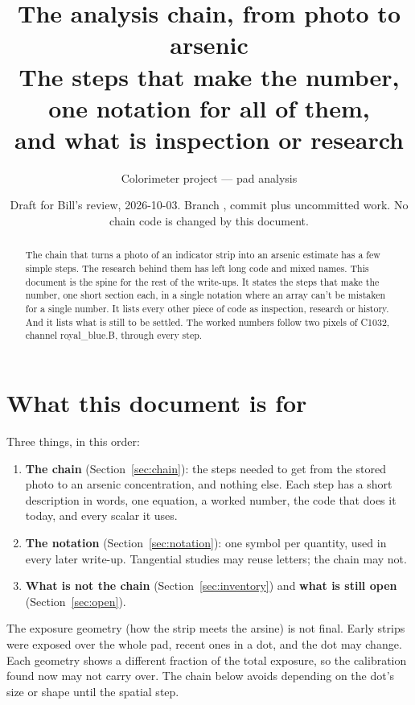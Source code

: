 \documentclass[11pt,letter]{article}
\title{The analysis chain, from photo to arsenic\\
\large The steps that make the number, one notation for all of them,\\
and what is inspection or research}
\author{Colorimeter project --- pad analysis}
\date{Draft for Bill's review, 2026-10-03.  Branch \file{preimage-capture},
commit \file{4962604} plus uncommitted work.  No chain code is changed by
this document.}
\begin{document}
\maketitle

\begin{abstract}
\noindent
The chain that turns a photo of an indicator strip into an arsenic
estimate has a few simple steps.  The research behind them has left
long code and mixed names.  This document is the spine for the rest of the
write-ups.  It states the steps that make the number, one short section
each, in a single notation where an array can't be mistaken for a single
number.  It lists every other piece of code as inspection, research or
history.  And it lists what is still to be settled.  The worked numbers
follow two pixels of C1032, channel royal\_blue.B, through every step.
\end{abstract}

\tableofcontents
\newpage

\section{What this document is for}

Three things, in this order:
\begin{enumerate}
  \item \textbf{The chain} (Section~\ref{sec:chain}): the steps needed to get
    from the stored photo to an arsenic concentration, and nothing else.
    Each step has a short description in words, one equation, a worked
    number, the code that does it today, and every scalar it uses.
  \item \textbf{The notation} (Section~\ref{sec:notation}): one symbol per
    quantity, used in every later write-up.  Tangential studies may reuse
    letters; the chain may not.
  \item \textbf{What is not the chain} (Section~\ref{sec:inventory}) and
    \textbf{what is still open} (Section~\ref{sec:open}).
\end{enumerate}

\noindent The exposure geometry (how the strip meets the arsine) is not
final.  Early strips were exposed over the whole pad, recent ones in a dot,
and the dot may change.  Each geometry shows a different fraction of the
total exposure, so the calibration found now may not carry over.  The chain
below avoids depending on the dot's size or shape until the spatial step.
\end{document}
